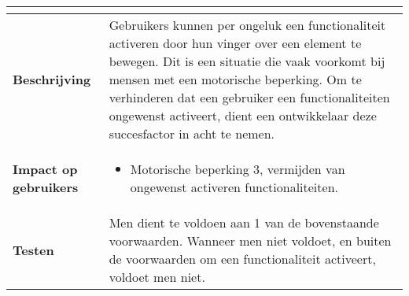 \begin{table}[H]
\begin{tabular}{|l|p{12cm}|}
\begin{itemize}
        \end{itemize}                                                                                                 \\ 
        \hline
        \textbf{Beschrijving}                 & Gebruikers kunnen per ongeluk een functionaliteit activeren door hun vinger over een element te bewegen. Dit is een situatie die vaak voorkomt bij mensen met een motorische beperking. Om te verhinderen dat een gebruiker een functionaliteiten ongewenst activeert,  dient een ontwikkelaar deze succesfactor in acht te nemen.  \\ 
        \hline
        \textbf{Impact op gebruikers}         &  
        \begin{itemize}
            \item Motorische beperking 3, vermijden van ongewenst activeren functionaliteiten.
            
            
        \end{itemize}                                                                                                                                                                                                                                                                                                                                                                                                                                                               \\ 
        \hline
        \textbf{Testen}                       & Men dient te voldoen aan 1 van de bovenstaande voorwaarden. Wanneer men niet voldoet, en buiten de voorwaarden om een functionaliteit activeert, voldoet men niet.                                                                                                            \\
        \hline
    \end{tabular}
    
\end{table}

